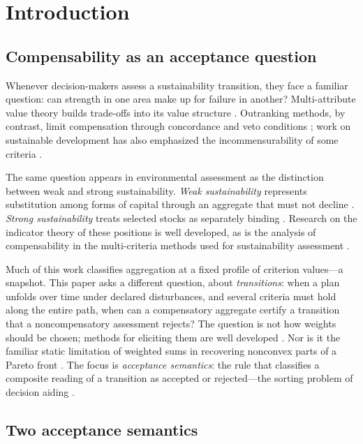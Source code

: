 \documentclass[preprint,11pt,authoryear]{elsarticle}
\theoremstyle{definition}
\theoremstyle{remark}
\begin{document}
\section{Introduction}\label{sec:intro}

\subsection{Compensability as an acceptance question}

Whenever decision-makers assess a sustainability transition, they face a familiar question: can strength in one area make up for failure in another? Multi-attribute value theory builds trade-offs into its value structure \citep{KeeneyRaiffa1976}. Outranking methods, by contrast, limit compensation through concordance and veto conditions \citep{Roy1996,Vincke1992}; work on sustainable development has also emphasized the incommensurability of some criteria \citep{Munda2005,MartinezAlier1998}.

The same question appears in environmental assessment as the distinction between weak and strong sustainability. \emph{Weak sustainability} represents substitution among forms of capital through an aggregate that must not decline \citep{WorldBank2011,Neumayer2013,Boos2015}. \emph{Strong sustainability} treats selected stocks as separately binding \citep{Daly1990,Ekins2003}. Research on the indicator theory of these positions is well developed, as is the analysis of compensability in the multi-criteria methods used for sustainability assessment \citep{Hanley1999,Martinet2011,CairnsMartinet2014,DoyenGajardo2020,Usubiaga2025,Cinelli2014,Schar2025}.

Much of this work classifies aggregation at a fixed profile of criterion values—a snapshot. This paper asks a different question, about \emph{transitions}: when a plan unfolds over time under declared disturbances, and several criteria must hold along the entire path, when can a compensatory aggregate certify a transition that a noncompensatory assessment rejects? The question is not how weights should be chosen; methods for eliciting them are well developed \citep{Nardo2008,Becker2017}. Nor is it the familiar static limitation of weighted sums in recovering nonconvex parts of a Pareto front \citep{DasDennis1997}. The focus is \emph{acceptance semantics}: the rule that classifies a composite reading of a transition as accepted or rejected—the sorting problem of decision aiding \citep{Roy1996}.

\subsection{Two acceptance semantics}
\end{document}
